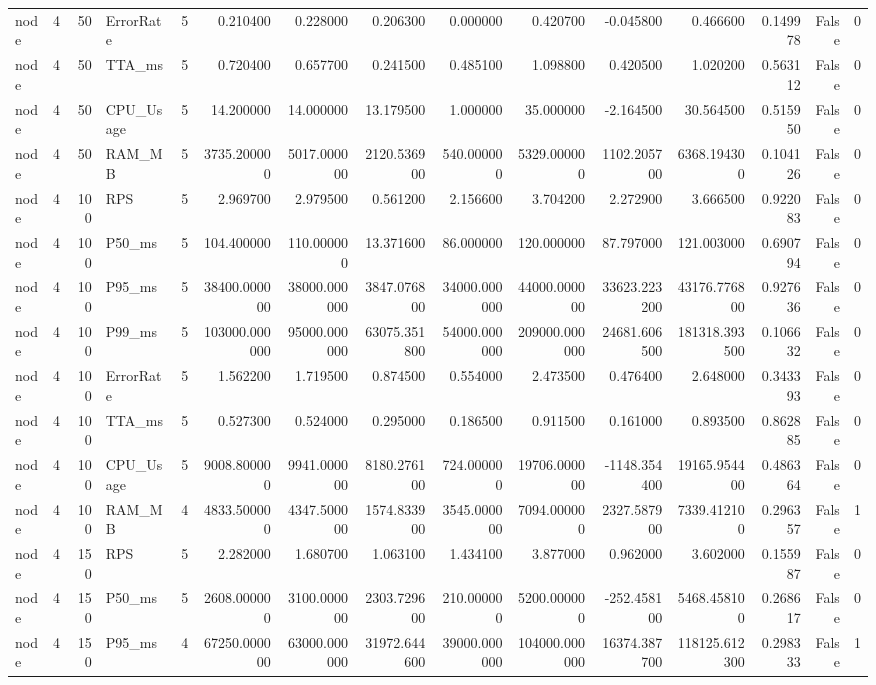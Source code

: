 \begin{tabular}{lrrlrrrrrrrrrrr}
node & 4 & 50 & ErrorRate & 5 & 0.210400 & 0.228000 & 0.206300 & 0.000000 & 0.420700 & -0.045800 & 0.466600 & 0.149978 & False & 0 \\
node & 4 & 50 & TTA_ms & 5 & 0.720400 & 0.657700 & 0.241500 & 0.485100 & 1.098800 & 0.420500 & 1.020200 & 0.563112 & False & 0 \\
node & 4 & 50 & CPU_Usage & 5 & 14.200000 & 14.000000 & 13.179500 & 1.000000 & 35.000000 & -2.164500 & 30.564500 & 0.515950 & False & 0 \\
node & 4 & 50 & RAM_MB & 5 & 3735.200000 & 5017.000000 & 2120.536900 & 540.000000 & 5329.000000 & 1102.205700 & 6368.194300 & 0.104126 & False & 0 \\
node & 4 & 100 & RPS & 5 & 2.969700 & 2.979500 & 0.561200 & 2.156600 & 3.704200 & 2.272900 & 3.666500 & 0.922083 & False & 0 \\
node & 4 & 100 & P50_ms & 5 & 104.400000 & 110.000000 & 13.371600 & 86.000000 & 120.000000 & 87.797000 & 121.003000 & 0.690794 & False & 0 \\
node & 4 & 100 & P95_ms & 5 & 38400.000000 & 38000.000000 & 3847.076800 & 34000.000000 & 44000.000000 & 33623.223200 & 43176.776800 & 0.927636 & False & 0 \\
node & 4 & 100 & P99_ms & 5 & 103000.000000 & 95000.000000 & 63075.351800 & 54000.000000 & 209000.000000 & 24681.606500 & 181318.393500 & 0.106632 & False & 0 \\
node & 4 & 100 & ErrorRate & 5 & 1.562200 & 1.719500 & 0.874500 & 0.554000 & 2.473500 & 0.476400 & 2.648000 & 0.343393 & False & 0 \\
node & 4 & 100 & TTA_ms & 5 & 0.527300 & 0.524000 & 0.295000 & 0.186500 & 0.911500 & 0.161000 & 0.893500 & 0.862885 & False & 0 \\
node & 4 & 100 & CPU_Usage & 5 & 9008.800000 & 9941.000000 & 8180.276100 & 724.000000 & 19706.000000 & -1148.354400 & 19165.954400 & 0.486364 & False & 0 \\
node & 4 & 100 & RAM_MB & 4 & 4833.500000 & 4347.500000 & 1574.833900 & 3545.000000 & 7094.000000 & 2327.587900 & 7339.412100 & 0.296357 & False & 1 \\
node & 4 & 150 & RPS & 5 & 2.282000 & 1.680700 & 1.063100 & 1.434100 & 3.877000 & 0.962000 & 3.602000 & 0.155987 & False & 0 \\
node & 4 & 150 & P50_ms & 5 & 2608.000000 & 3100.000000 & 2303.729600 & 210.000000 & 5200.000000 & -252.458100 & 5468.458100 & 0.268617 & False & 0 \\
node & 4 & 150 & P95_ms & 4 & 67250.000000 & 63000.000000 & 31972.644600 & 39000.000000 & 104000.000000 & 16374.387700 & 118125.612300 & 0.298333 & False & 1 \\

\end{tabular}
